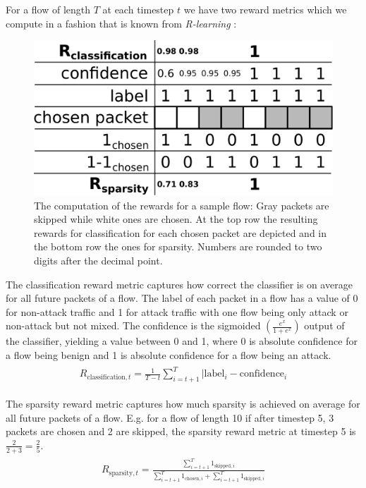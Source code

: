 \documentclass[conference]{IEEEtran}
\begin{document}
For a flow of length $T$ at each timestep $t$ we have two reward metrics which we compute in a fashion that is known from \textit{R-learning} \cite{schwartz_reinforcement_1993}:

\begin{figure}
\centering
  \includegraphics[width=\columnwidth]{img/rewards.pdf}
  \caption{The computation of the rewards for a sample flow: Gray packets are skipped while white ones are chosen. At the top row the resulting rewards for classification for each chosen packet are depicted and in the bottom row the ones for sparsity. Numbers are rounded to two digits after the decimal point.}
  \label{fig:rewards}
\end{figure}

The classification reward metric captures how correct the classifier is on average for all future packets of a flow. The label of each packet in a flow has a value of 0 for non-attack traffic and 1 for attack traffic with one flow being only attack or non-attack but not mixed. The confidence is the sigmoided $\left(\frac{e^x}{1+e^x}\right)$ output of the classifier, yielding a value between 0 and 1, where 0 is absolute confidence for a flow being benign and 1 is absolute confidence for a flow being an attack. 
\begin{align}
\begin{split}
R_{\text{classification},t} = \frac{1}{T-t} \sum_{i=t+1}^{T} |\text{label}_i - \text{confidence}_i
\end{split}
\end{align}

The sparsity reward metric captures how much sparsity is achieved on average for all future packets of a flow. E.g. for a flow of length 10 if after timestep 5, 3 packets are chosen and 2 are skipped, the sparsity reward metric at timestep 5 is $\frac{2}{2+3}=\frac{2}{5}$.
\begin{align}
\begin{split}
R_{\text{sparsity},t} = \frac{\sum_{i=t+1}^{T} 1_{\text{skipped},i}}{\sum_{i=t+1}^{T} 1_{\text{chosen},i}+\sum_{i=t+1}^{T} 1_{\text{skipped},i}}
\end{split}
\end{align}
\end{document}
